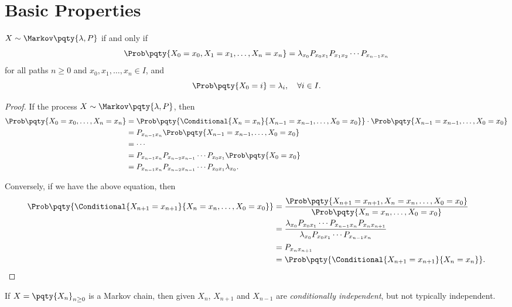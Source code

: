 \section{Basic Properties}

\begin{theorem}
    \label{thm:markov-chain-characterisation}%
    \(X \sim \Markov\pqty{\lambda, P}\) if and only if
    \[
        \Prob\pqty{X_0 = x_0, X_1 = x_1, \ldots, X_n = x_n} = \lambda_{x_0} P_{x_0 x_1} P_{x_1 x_2} \cdots P_{x_{n - 1} x_n}
    \]
    for all paths \(n \geq 0\) and \(x_0, x_1, \ldots, x_n \in I\), and
    \[
        \Prob\pqty{X_0 = i} = \lambda_i, \quad \forall i \in I.
    \]
\end{theorem}

\begin{proof}
    If the process \(X \sim \Markov\pqty{\lambda, P}\), then
    \begin{align*}
        \Prob\pqty{X_0 = x_0, \ldots, X_n = x_n} &= \Prob\pqty{\Conditional{X_n = x_n}{X_{n - 1} = x_{n - 1}, \ldots, X_0 = x_0}} \cdot \Prob\pqty{X_{n - 1} = x_{n - 1}, \ldots, X_0 = x_0} \\
        &= P_{x_{n - 1} x_n} \Prob\pqty{X_{n - 1} = x_{n - 1}, \ldots, X_0 = x_0} \\
        &= \cdots \\
        &= P_{x_{n - 1} x_n} P_{x_{n - 2} x_{n - 1}} \cdots P_{x_0 x_1} \Prob\pqty{X_0 = x_0} \\
        &= P_{x_{n - 1} x_n} P_{x_{n - 2} x_{n - 1}} \cdots P_{x_0 x_1} \lambda_{x_0}.
    \end{align*}

    Conversely, if we have the above equation, then
    \begin{align*}
        \Prob\pqty{\Conditional{X_{n + 1} = x_{n + 1}}{X_n = x_n, \ldots, X_0 = x_0}} &= \frac{\Prob\pqty{X_{n + 1} = x_{n + 1}, X_n = x_n, \ldots, X_0 = x_0}}{\Prob\pqty{X_n = x_n, \ldots, X_0 = x_0}} \\
        &= \frac{\lambda_{x_0} P_{x_0 x_1} \cdots P_{x_{n - 1} x_n} P_{x_n x_{n + 1}}}{\lambda_{x_0} P_{x_0 x_1} \cdots P_{x_{n - 1} x_n}} \\
        &= P_{x_n x_{n + 1}} \\
        &= \Prob\pqty{\Conditional{X_{n + 1} = x_{n + 1}}{X_n = x_n}}.
    \end{align*}
\end{proof}

\begin{remark}
    If \(X = \pqty{X_n} _{n \geq 0}\) is a Markov chain, then given \(X_{n}\), \(X_{n + 1}\) and \(X_{n - 1}\) are \emph{conditionally independent}, but not typically independent.
\end{remark}

